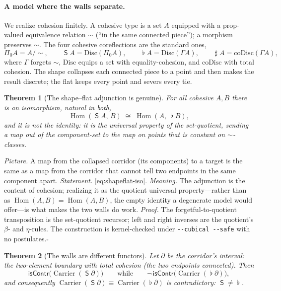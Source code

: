 \documentclass[11pt,letterpaper]{article}
\theoremstyle{plain}
\newtheorem{theorem}{Theorem}[section]
\theoremstyle{definition}
\theoremstyle{remark}
\newcommand{\shapeM}{\mathop{\mathsf{S}}\nolimits}      %
\newcommand{\flatM}{\mathop{\flat}\nolimits}            %
\newcommand{\sharpM}{\mathop{\sharp}\nolimits}          %
\newcommand{\Bd}{\partial}                              %
\newcommand{\isContr}{\mathsf{isContr}}
\newcommand{\PiZero}{\Pi_0}                             %
\newcommand{\Disc}{\mathrm{Disc}}
\newcommand{\Gam}{\Gamma}
\newcommand{\coDisc}{\mathrm{coDisc}}
\DeclareMathOperator{\Hom}{Hom}
\DeclareMathOperator{\Carrier}{Carrier}
\begin{document}
\paragraph{A model where the walls separate.}
We realize cohesion finitely. A cohesive type is a set $A$ equipped with a
prop-valued equivalence relation $\sim$ (``in the same connected piece''); a
morphism preserves $\sim$. The four cohesive coreflections are the standard ones,
\begin{equation}\label{eq:cohesion-modalities}
  \PiZero A = A/{\sim}, \qquad
  \shapeM A = \Disc(\PiZero A), \qquad
  \flatM A = \Disc(\Gam A), \qquad
  \sharpM A = \coDisc(\Gam A),
\end{equation}
where $\Gam$ forgets $\sim$, $\Disc$ equips a set with equality-cohesion, and
$\coDisc$ with total cohesion. The shape collapses each connected piece to a point
and then makes the result discrete; the flat keeps every point and severs every
tie.

\begin{theorem}[The shape--flat adjunction is genuine]\label{thm:shapeflat}
For all cohesive $A,B$ there is an isomorphism, natural in both,
\begin{equation}\label{eq:shapeflat-iso}
  \Hom(\shapeM A,\,B)\;\cong\;\Hom(A,\,\flatM B),
\end{equation}
and it is \emph{not} the identity: it is the universal property of the
set-quotient, sending a map out of the component-set to the map on points that is
constant on $\sim$-classes.
\end{theorem}

\noindent\emph{Picture.} A map from the collapsed corridor (its components) to a
target is the same as a map from the corridor that cannot tell two endpoints in
the same component apart. \emph{Statement.} \cref{eq:shapeflat-iso}.
\emph{Meaning.} The adjunction is the content of cohesion; realizing it as the
quotient universal property---rather than as $\Hom(A,B)=\Hom(A,B)$, the empty
identity a degenerate model would offer---is what makes the two walls do work.
\emph{Proof.} The forgetful-to-quotient transposition is the set-quotient
recursor; left and right inverses are the quotient's $\beta$- and
$\eta$-rules. The construction is kernel-checked under \texttt{-{}-cubical
-{}-safe} with no postulates.\hfill$\square$

\begin{theorem}[The walls are different functors]\label{thm:shapenotflat}
Let $\Bd$ be the corridor's interval: the two-element boundary with \emph{total}
cohesion (the two endpoints connected). Then
\begin{equation}\label{eq:shape-collapses}
  \isContr\big(\Carrier(\shapeM \Bd)\big)
  \qquad\text{while}\qquad
  \neg\,\isContr\big(\Carrier(\flatM \Bd)\big),
\end{equation}
and consequently $\Carrier(\shapeM \Bd)\equiv\Carrier(\flatM \Bd)$ is
contradictory: $\shapeM\neq\flatM$.
\end{theorem}
\end{document}
